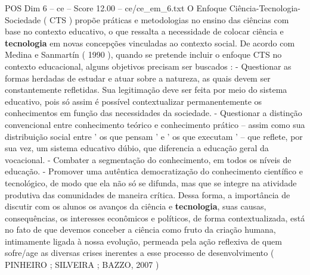 \begin{textsample}{POS Dim 6 – ce – Score 12.00 – ce/ce\_em\_6.txt}
O Enfoque Ciência-Tecnologia-Sociedade ( CTS ) propõe práticas e metodologias no ensino das ciências com base no contexto educativo, o que ressalta a necessidade de colocar ciência e \textbf{tecnologia} em novas concepções vinculadas ao contexto social.
De acordo com Medina e Sanmartín ( 1990 ), quando se pretende incluir o enfoque CTS no contexto educacional, alguns objetivos precisam ser buscados : - Questionar as formas herdadas de estudar e atuar sobre a natureza, as quais devem ser constantemente refletidas.
Sua legitimação deve ser feita por meio do sistema educativo, pois só assim é possível contextualizar permanentemente os conhecimentos em função das necessidades da sociedade. - Questionar a distinção convencional entre conhecimento teórico e conhecimento prático – assim como sua distribuição social entre ' os que pensam ' e ' os que executam ' – que reflete, por sua vez, um sistema educativo dúbio, que diferencia a educação geral da vocacional. - Combater a segmentação do conhecimento, em todos os níveis de educação. - Promover uma autêntica democratização do conhecimento científico e tecnológico, de modo que ela não só se difunda, mas que se integre na atividade produtiva das comunidades de maneira crítica.
Dessa forma, a importância de discutir com os alunos os avanços da ciência e \textbf{tecnologia}, suas causas, consequências, os interesses econômicos e políticos, de forma contextualizada, está no fato de que devemos conceber a ciência como fruto da criação humana, intimamente ligada à nossa evolução, permeada pela ação reflexiva de quem sofre/age as diversas crises inerentes a esse processo de desenvolvimento ( PINHEIRO ; SILVEIRA ; BAZZO, 2007 )

\end{textsample}
